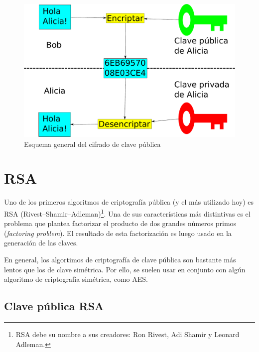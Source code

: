 \begin{figure}[ht]
  \centering
  \includegraphics[scale=0.3]{Figures/PublicKeyEncryption}
  \decoRule
  \caption[Cifrado de clave pública (Esquema)]{Esquema general del cifrado de clave pública}
  \label{fig:PublicKeyEncryption}
\end{figure}


\section{RSA}

\label{RSA}

Uno de los primeros algoritmos de criptografía pública (y el más utilizado hoy) es RSA (Rivest–Shamir–Adleman)\footnote{RSA debe su nombre a sus creadores: Ron Rivest, Adi Shamir y Leonard Adleman.}. Una de sus características más distintivas es el problema que plantea factorizar el producto de dos grandes números primos (\emph{factoring problem}). El resultado de esta factorización es luego usado en la generación de las claves.

En general, los algortimos de criptografía de clave pública son bastante más lentos que los de clave simétrica. Por ello, se suelen usar en conjunto con algún algoritmo de criptografía simétrica, como AES. \emph{\parencite{Reference9}}

\subsection{Clave pública RSA}


